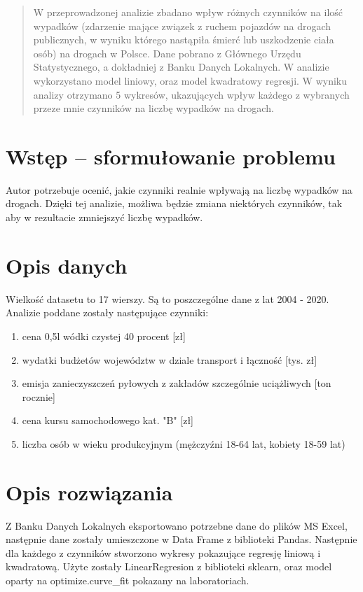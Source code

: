 \documentclass[10pt]{article}
\begin{document}


\begin{abstract}
W przeprowadzonej analizie zbadano wpływ różnych czynników na ilość wypadków (zdarzenie mające związek z ruchem pojazdów na drogach publicznych, w wyniku którego nastąpiła śmierć lub uszkodzenie ciała osób) na drogach w Polsce. Dane pobrano z Głównego Urzędu Statystycznego, a dokładniej z Banku Danych Lokalnych. W analizie wykorzystano model liniowy, oraz model kwadratowy regresji. W wyniku analizy otrzymano 5 wykresów, ukazujących wpływ każdego z wybranych przeze mnie czynników na liczbę wypadków na drogach. 

\end{abstract}

\section{Wstęp -- sformułowanie problemu}
\label{sec:wstep}
Autor potrzebuje ocenić, jakie czynniki realnie wpływają na liczbę wypadków na drogach. Dzięki tej analizie, możliwa będzie zmiana niektórych czynników, tak aby w rezultacie zmniejszyć liczbę wypadków.



\section{Opis danych}
Wielkość datasetu to 17 wierszy. Są to poszczególne dane z lat 2004 - 2020. Analizie poddane zostały następujące czynniki:
\begin{enumerate}
    \item cena 0,5l wódki czystej 40 procent [zł] 
    \item wydatki budżetów województw w dziale transport i łączność [tys. zł]
    \item emisja zanieczyszczeń pyłowych z zakładów szczególnie uciążliwych [ton rocznie]
    \item cena kursu samochodowego kat. "B" [zł]
    \item liczba osób w wieku produkcyjnym (mężczyźni 18-64 lat, kobiety 18-59 lat)
\end{enumerate}

\section{Opis rozwiązania}
Z Banku Danych Lokalnych eksportowano potrzebne dane do plików MS Excel, następnie dane zostały umieszczone w Data Frame z biblioteki Pandas. Następnie dla każdego z czynników stworzono wykresy pokazujące regresję liniową i kwadratową. Użyte zostały LinearRegresion z biblioteki sklearn, oraz model oparty na optimize.curve\_fit pokazany na laboratoriach.
\end{document}
